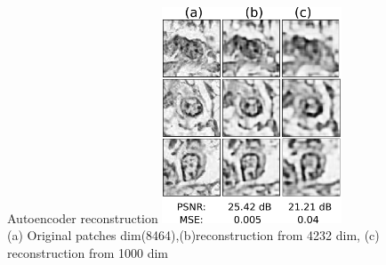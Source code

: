 \documentclass[usenames,dvipsnames]{beamer}
\begin{document}
\begin{frame}{Autoencoder reconstruction}
\centering\includegraphics[width=0.4\textwidth]{imagenes_cnn/reconstruction.png}
    \\(a) Original patches dim(8464),(b)reconstruction from 4232 dim, (c) reconstruction from  1000 dim
\end{frame}



    
\end{document}
